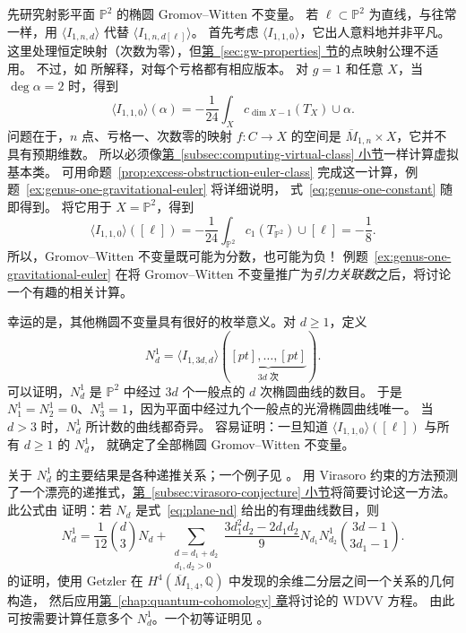 \begin{example}\label{ex:plane-genus-one}
先研究射影平面 $\mathbb P^2$ 的椭圆 Gromov--Witten 不变量。
若 $\ell\subset\mathbb P^2$ 为直线，与往常一样，用 $\langle I_{1,n,d}\rangle$ 代替 $\langle I_{1,n,d[\ell]}\rangle$。
首先考虑 $\langle I_{1,1,0}\rangle$，它出人意料地并非平凡。
这里处理恒定映射（次数为零），但\hyperref[sec:gw-properties]{第~\ref*{sec:gw-properties} 节}的点映射公理不适用。
不过，如  所解释，对每个亏格都有相应版本。
对 $g=1$ 和任意 $X$，当 $\deg\alpha=2$ 时，得到
\begin{equation}\label{eq:genus-one-constant}
\langle I_{1,1,0}\rangle(\alpha)=-\frac1{24}\int_Xc_{\dim X-1}(T_X)\cup\alpha.
\end{equation}
问题在于，$n$ 点、亏格一、次数零的映射 $f:C\to X$ 的空间是
$\overline M_{1,n}\times X$，它并不具有预期维数。
所以必须像\hyperref[subsec:computing-virtual-class]{第~\ref*{subsec:computing-virtual-class} 小节}一样计算虚拟基本类。
可用命题~\ref{prop:excess-obstruction-euler-class} 完成这一计算，例题~\ref{ex:genus-one-gravitational-euler} 将详细说明，
式~\eqref{eq:genus-one-constant} 随即得到。
将它用于 $X=\mathbb P^2$，得到
\[
\langle I_{1,1,0}\rangle([\ell])=-\frac1{24}\int_{\mathbb P^2}c_1(T_{\mathbb P^2})\cup[\ell]=-\frac18.
\]
所以，Gromov--Witten 不变量既可能为分数，也可能为负！
例题~\ref{ex:genus-one-gravitational-euler} 在将 Gromov--Witten 不变量推广为\emph{引力关联数}之后，将讨论一个有趣的相关计算。

幸运的是，其他椭圆不变量具有很好的枚举意义。对 $d\geq1$，定义
\[
N_d^1=\langle I_{1,3d,d}\rangle(\underbrace{[pt],\ldots,[pt]}_{3d\text{ 次}}).
\]
可以证明，$N_d^1$ 是 $\mathbb P^2$ 中经过 $3d$ 个一般点的 $d$ 次椭圆曲线的数目。
于是 $N_1^1=N_2^1=0$、$N_3^1=1$，因为平面中经过九个一般点的光滑椭圆曲线唯一。
当 $d>3$ 时，$N_d^1$ 所计数的曲线都奇异。
容易证明：一旦知道 $\langle I_{1,1,0}\rangle([\ell])$ 与所有 $d\geq1$ 的 $N_d^1$，
就确定了全部椭圆 Gromov--Witten 不变量。

关于 $N_d^1$ 的主要结果是各种递推关系；一个例子见 。
 用 Virasoro 约束的方法预测了一个漂亮的递推式，\hyperref[subsec:virasoro-conjecture]{第~\ref*{subsec:virasoro-conjecture} 小节}将简要讨论这一方法。
此公式由  证明：若 $N_d$ 是式~\eqref{eq:plane-nd} 给出的有理曲线数目，则
\begin{equation}\label{eq:plane-genus-one-recursion}
N_d^1=\frac1{12}\binom d3N_d+
\sum_{\substack{d=d_1+d_2\\d_1,d_2>0}}
\frac{3d_1^2d_2-2d_1d_2}{9}N_{d_1}N_{d_2}^1\binom{3d-1}{3d_1-1}.
\end{equation}
 的证明，使用 Getzler 在
$H^4(\overline M_{1,4},\mathbb Q)$ 中发现的余维二分层之间一个关系的几何构造，
然后应用\hyperref[chap:quantum-cohomology]{第~\ref*{chap:quantum-cohomology} 章}将讨论的 WDVV 方程。
由此可按需要计算任意多个 $N_d^1$。一个初等证明见 。


\end{example}
